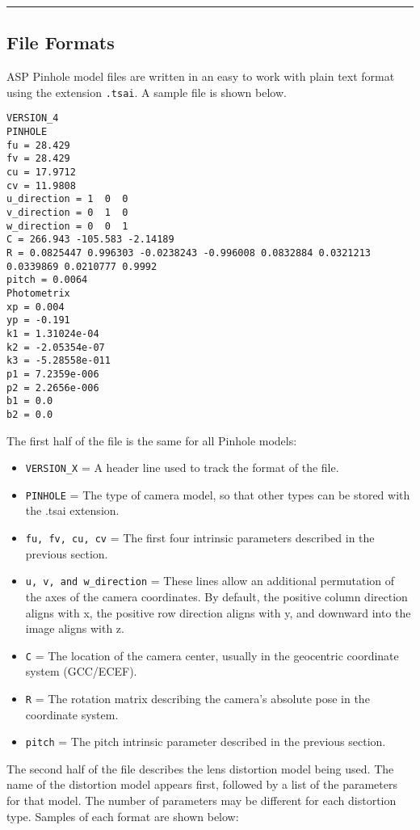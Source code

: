 \hrule
\subsection{File Formats}
\label{file_format}
\bigskip

ASP Pinhole model files are written in an easy to work with plain text format 
using the extension \texttt{.tsai}.
A sample file is shown below. 

\begin{verbatim}
VERSION_4
PINHOLE
fu = 28.429
fv = 28.429
cu = 17.9712
cv = 11.9808
u_direction = 1  0  0
v_direction = 0  1  0
w_direction = 0  0  1
C = 266.943 -105.583 -2.14189
R = 0.0825447 0.996303 -0.0238243 -0.996008 0.0832884 0.0321213 0.0339869 0.0210777 0.9992
pitch = 0.0064
Photometrix
xp = 0.004
yp = -0.191
k1 = 1.31024e-04
k2 = -2.05354e-07
k3 = -5.28558e-011
p1 = 7.2359e-006
p2 = 2.2656e-006
b1 = 0.0
b2 = 0.0
\end{verbatim}

The first half of the file is the same for all Pinhole models:

\begin{itemize}{}
\item  \texttt{VERSION\_X} = A header line used to track the format of the file.
\item  \texttt{PINHOLE} = The type of camera model, so that other types can be stored with the .tsai extension.
\item  \texttt{fu, fv, cu, cv} = The first four intrinsic parameters described in the previous section.
\item  \texttt{u, v, and w\_direction} = These lines allow an additional permutation of the 
axes of the camera coordinates.  By default, the positive column direction aligns with x, the
positive row direction aligns with y, and downward into the image aligns with z.
\item  \texttt{C} = The location of the camera center, usually in the geocentric coordinate system (GCC/ECEF).
\item  \texttt{R} = The rotation matrix describing the camera's absolute pose in the coordinate system.
\item  \texttt{pitch} = The pitch intrinsic parameter described in the previous section.
\end{itemize}

The second half of the file describes the lens distortion model being used.  The name of the
distortion model appears first, followed by a list of the parameters for that model.  The number
of parameters may be different for each distortion type.  Samples of each format are shown below:

